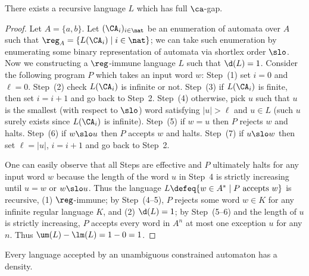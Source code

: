 \begin{theorem}\label{thm:hard}
There exists a recursive language \(L\) which has full \(\ca\)-gap.
\end{theorem}
\begin{proof}
Let \(A = \{a,b\}\).
Let \((\CA_i)_{i \in \nat}\) be an enumeration of automata over \(A\)
 such that \(\reg_A = \{ L(\CA_i) \mid i \in \nat\}\); we can take such
 enumeration by enumerating some binary representation of automata via
 shortlex order \(\slo\).
Now we constructing a \(\reg\)-immune language \(L\) such that \(\d(L) = 1\).
Consider the following program \(P\) which takes an input word \(w\):
Step~(1) set \(i = 0\) and \(\ell = 0\).
Step~(2) check \(L(\CA_i)\) is infinite or not.
Step~(3) if \(L(\CA_i)\) is finite, then set \(i = i + 1\) and go back to Step~2.
Step~(4) otherwise, pick \(u\) such that \(u\) is the smallest
	    (with respect to \(\slo\)) word satisfying
	    \(|u| > \ell\) and \(u \in L\) (such \(u\) surely exists
	    since \(L(\CA_i)\) is infinite).
Step~(5) if \(w = u\) then \(P\) rejects \(w\) and halts.
Step~(6) if \(w \slo u\) then \(P\) accepts \(w\) and halts.
Step~(7) if \(u \slo w\) then set \(\ell = |u|\), \(i = i + 1\) and
	    go back to Step~2.

One can easily observe that all Steps are effective and \(P\) ultimately
 halts for any input word \(w\) because the length of the word \(u\) in Step~4 is strictly
 increasing until \(u = w\) or \(w \slo u\).
Thus the language \(L \defeq \{ w \in A^* \mid P \text{ accepts } w \}\) is
 recursive, (1) \(\reg\)-immune; by Step~(4--5), \(P\) rejects some word
 \(w \in K\) for any infinite regular language \(K\), and (2) \(\d(L)
 = 1\); by Step~(5--6) and the length of \(u\) is strictly increasing,
 \(P\) accepts every word in \(A^n\) at most one
 exception \(u\) for any \(n\).
 Thus \(\um(L) - \lm(L) = 1 - 0 = 1\).
\end{proof}

\begin{conjecture}\label{con:uncadensity}
Every language accepted by an unambiguous constrained automaton has a density.
\end{conjecture}